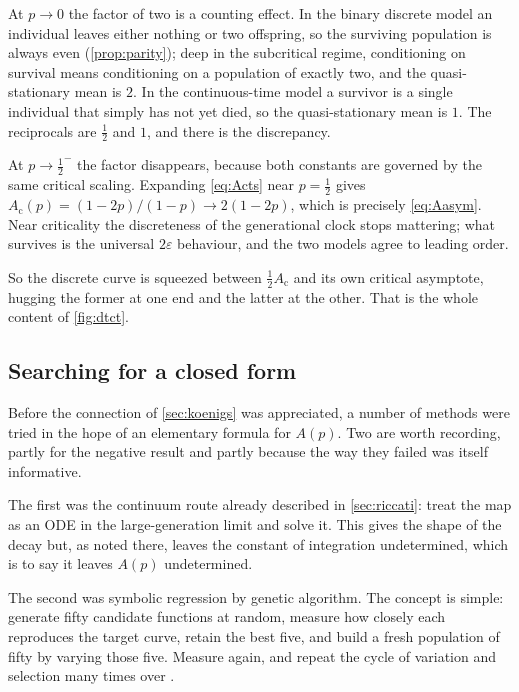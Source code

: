 At $p\to0$ the factor of two is a counting effect. In the binary discrete model an
individual leaves either nothing or two offspring, so the surviving population is always
even (\cref{prop:parity}); deep in the subcritical regime, conditioning on survival means
conditioning on a population of exactly two, and the quasi-stationary mean is $2$. In
the continuous-time model a survivor is a single individual that simply has not yet died,
so the quasi-stationary mean is $1$. The reciprocals are $\tfrac12$ and $1$, and there is
the discrepancy.

At $p\to\tfrac12^-$ the factor disappears, because both constants are governed by the
same critical scaling. Expanding \cref{eq:Acts} near $p=\tfrac12$ gives
$A_{\text{c}}(p) = (1-2p)/(1-p) \to 2(1-2p)$, which is precisely \cref{eq:Aasym}. Near
criticality the discreteness of the generational clock stops mattering; what survives is
the universal $2\varepsilon$ behaviour, and the two models agree to leading order.

So the discrete curve is squeezed between $\tfrac12 A_{\text{c}}$ and its own critical
asymptote, hugging the former at one end and the latter at the other. That is the whole
content of \cref{fig:dtct}.

\subsection{Searching for a closed form}
\label{sec:GA}

Before the connection of \cref{sec:koenigs} was appreciated, a number of methods were
tried in the hope of an elementary formula for $A(p)$. Two are worth recording, partly
for the negative result and partly because the way they failed was itself informative.

The first was the continuum route already described in \cref{sec:riccati}: treat the map
as an ODE in the large-generation limit and solve it. This gives the shape of the decay
but, as noted there, leaves the constant of integration undetermined, which is to say it
leaves $A(p)$ undetermined.

The second was symbolic regression by genetic algorithm. The concept is simple: generate
fifty candidate functions at random, measure how closely each reproduces the target
curve, retain the best five, and build a fresh population of fifty by varying those five.
Measure again, and repeat the cycle of variation and selection many times over
\cite{stanley2002evolving,cohen2024physics}.

